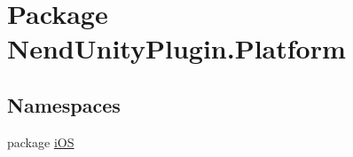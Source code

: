 \hypertarget{namespace_nend_unity_plugin_1_1_platform}{}\section{Package Nend\+Unity\+Plugin.\+Platform}
\label{namespace_nend_unity_plugin_1_1_platform}
\subsection*{Namespaces}
\begin{DoxyCompactItemize}
\item 
package \hyperlink{namespace_nend_unity_plugin_1_1_platform_1_1i_o_s}{i\+O\+S}
\end{DoxyCompactItemize}
